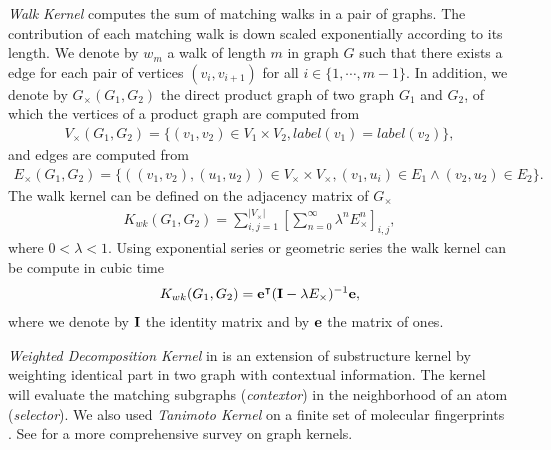 {%
\textit{Walk Kernel} \citep{Kashima03marginalized,Gartner03a} computes the sum of matching walks in a pair of graphs. 
The contribution of each matching walk is down scaled exponentially according to its length.  
We denote by $w_m$ a walk of length $m$ in graph $G$ such that there exists a edge for each pair of vertices $(v_i,v_{i+1})$ for all $i\in\{1,\cdots,m-1\}$.
In addition, we denote by $G_{\times}(G_1,G_2)$ the direct product graph of two graph $G_1$ and $G_2$, of which the vertices of a product graph are computed from 
\begin{align*}
	V_{\times}(G_1,G_2) = \{(v_1,v_2)\in V_1\times V_2, label(v_1)=label(v_2)\},
\end{align*}
and edges are computed from
\begin{align*}
	E_{\times}(G_1,G_2) = \{((v_1,v_2),(u_1,u_2))\in V_{\times}\times V_{\times},(v_1,u_i)\in E_1\wedge (v_2,u_2)\in E_2\}.
\end{align*}
The walk kernel can be defined on the adjacency matrix of $G_{\times}$
\begin{align*}
	K_{wk}(G_1,G_2) = \sum_{i,j=1}^{|V_{\times}|}\left[\sum_{n=0}^{\infty}\lambda^{n}E_{\times}^n\right]_{i,j},
\end{align*}
where $0<\lambda<1$.
Using exponential series or geometric series the walk kernel can be compute in cubic time \citep{Gartner03a}
\begin{align*}
	K_{wk}(G_1,G_2) = \mathbf {e}^{\intercal}(\mathbf{I}-\lambda E_{\times})^{-1}\mathbf {e},
\end{align*}
where we denote by $\mathbf{I}$ the identity matrix and by $\mathbf {e}$ the matrix of ones.

\textit{Weighted Decomposition Kernel} in \citep{Menchetti05weighted,Ceroni08classification} is an extension of substructure kernel \citep{Haussler99convolution} by weighting identical part in two graph with contextual information.
The kernel will evaluate the matching subgraphs (\textit{contextor}) in the neighborhood of an atom (\textit{selector}).
We also used \textit{Tanimoto Kernel} \citep{Ralaivola05graph} on a finite set of molecular fingerprints \citep{Wang09pubchem}.
See \citep{Vishwanathan10graph} for a more comprehensive survey on graph kernels.

}
